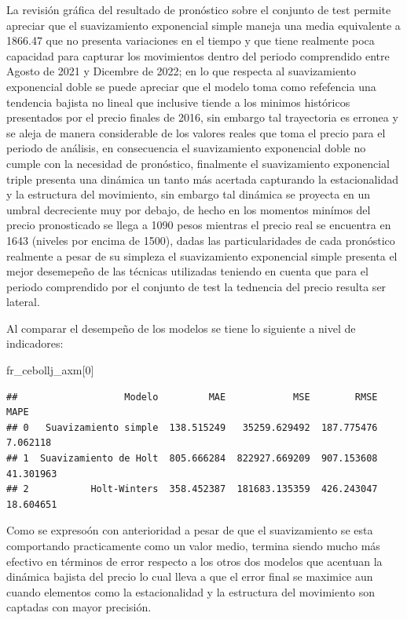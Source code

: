 \documentclass[
]{book}
\newenvironment{Shaded}{\begin{snugshade}}{\end{snugshade}}
\newcommand{\DecValTok}[1]{\textcolor[rgb]{0.00,0.00,0.81}{#1}}
\newcommand{\NormalTok}[1]{#1}
\begin{document}
La revisión gráfica del resultado de pronóstico sobre el conjunto de test permite apreciar que el suavizamiento exponencial simple maneja una media equivalente a 1866.47 que no presenta variaciones en el tiempo y que tiene realmente poca capacidad para capturar los movimientos dentro del periodo comprendido entre Agosto de 2021 y Dicembre de 2022; en lo que respecta al suavizamiento exponencial doble se puede apreciar que el modelo toma como refefencia una tendencia bajista no lineal que inclusive tiende a los minimos históricos presentados por el precio finales de 2016, sin embargo tal trayectoria es erronea y se aleja de manera considerable de los valores reales que toma el precio para el periodo de análisis, en consecuencia el suavizamiento exponencial doble no cumple con la necesidad de pronóstico, finalmente el suavizamiento exponencial triple presenta una dinámica un tanto más acertada capturando la estacionalidad y la estructura del movimiento, sin embargo tal dinámica se proyecta en un umbral decreciente muy por debajo, de hecho en los momentos minímos del precio pronosticado se llega a 1090 pesos mientras el precio real se encuentra en 1643 (niveles por encima de 1500), dadas las particularidades de cada pronóstico realmente a pesar de su simpleza el suavizamiento exponencial simple presenta el mejor desemepeño de las técnicas utilizadas teniendo en cuenta que para el periodo comprendido por el conjunto de test la tednencia del precio resulta ser lateral.

Al comparar el desempeño de los modelos se tiene lo siguiente a nivel de indicadores:

\begin{Shaded}
\begin{Highlighting}[]

\NormalTok{fr\_cebollj\_axm[}\DecValTok{0}\NormalTok{]}
\end{Highlighting}
\end{Shaded}

\begin{verbatim}
##                   Modelo         MAE            MSE        RMSE       MAPE
## 0   Suavizamiento simple  138.515249   35259.629492  187.775476   7.062118
## 1  Suavizamiento de Holt  805.666284  822927.669209  907.153608  41.301963
## 2           Holt-Winters  358.452387  181683.135359  426.243047  18.604651
\end{verbatim}

Como se expresoón con anterioridad a pesar de que el suavizamiento se esta comportando practicamente como un valor medio, termina siendo mucho más efectivo en términos de error respecto a los otros dos modelos que acentuan la dinámica bajista del precio lo cual lleva a que el error final se maximice aun cuando elementos como la estacionalidad y la estructura del movimiento son captadas con mayor precisión.
\end{document}
